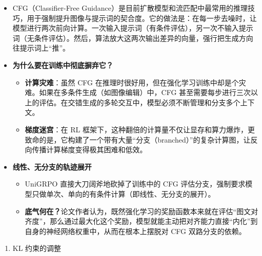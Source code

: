 \begin{itemize}
\tightlist
\item
  CFG（Classifier-Free Guidance）是目前扩散模型和流匹配中最常用的推理技巧，用于强制提升图像与提示词的契合度。它的做法是：在每一步去噪时，让模型进行两次前向计算。一次输入提示词（有条件评估），另一次不输入提示词（无条件评估）。然后，算法放大这两次输出差异的向量，强行把生成方向往提示词上``推''。
\item
  \textbf{为什么要在训练中彻底摒弃它？}

  \begin{itemize}
  \tightlist
  \item
    \textbf{计算灾难}：虽然 CFG 在推理时很好用，但在强化学习训练中却是个灾难。如果在多条件生成（如图像编辑）中，CFG 甚至需要每步进行三次以上的评估。在交错生成的多轮交互中，模型必须不断管理和分支多个上下文。
  \item
    \textbf{梯度迷宫}：在 RL 框架下，这种翻倍的计算量不仅让显存和算力爆炸，更致命的是，它构建了一个带有大量``分支（branched）''的复杂计算图，让反向传播计算梯度变得极其困难和低效。
  \end{itemize}
\item
  \textbf{线性、无分支的轨迹展开}

  \begin{itemize}
  \tightlist
  \item
    UniGRPO 直接大刀阔斧地砍掉了训练中的 CFG 评估分支，强制要求模型只做单次、单向的有条件计算（即线性、无分支的展开）。
  \item
    \textbf{底气何在？}论文作者认为，既然强化学习的奖励函数本来就在评估``图文对齐度''，那么通过最大化这个奖励，模型就能主动把对齐能力直接``内化''到自身的神经网络权重中，从而在根本上摆脱对 CFG 双路分支的依赖。
  \end{itemize}
\end{itemize}

\begin{enumerate}
\def\labelenumi{\arabic{enumi}.}
\setcounter{enumi}{3}
\tightlist
\item
  KL 约束的调整
\end{enumerate}


